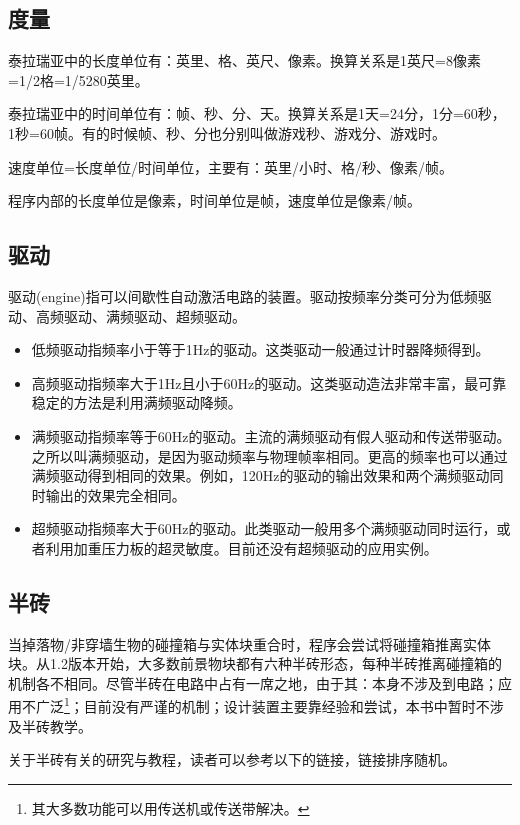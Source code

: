 \subsection{度量}
泰拉瑞亚中的长度单位有：英里、格、英尺、像素。换算关系是1英尺=8像素=1/2格=1/5280英里。

泰拉瑞亚中的时间单位有：帧、秒、分、天。换算关系是1天=24分，1分=60秒，1秒=60帧。有的时候帧、秒、分也分别叫做游戏秒、游戏分、游戏时。

速度单位=长度单位/时间单位，主要有：英里/小时、格/秒、像素/帧。

程序内部的长度单位是像素，时间单位是帧，速度单位是像素/帧。

\subsection{驱动}

驱动(engine)指可以间歇性自动激活电路的装置。驱动按频率分类可分为低频驱动、高频驱动、满频驱动、超频驱动。

\begin{itemize}
\item 低频驱动指频率小于等于1Hz的驱动。这类驱动一般通过计时器降频得到。
\item 高频驱动指频率大于1Hz且小于60Hz的驱动。这类驱动造法非常丰富，最可靠稳定的方法是利用满频驱动降频。
\item 满频驱动指频率等于60Hz的驱动。主流的满频驱动有假人驱动和传送带驱动。之所以叫满频驱动，是因为驱动频率与物理帧率相同。更高的频率也可以通过满频驱动得到相同的效果。例如，120Hz的驱动的输出效果和两个满频驱动同时输出的效果完全相同。
\item 超频驱动指频率大于60Hz的驱动。此类驱动一般用多个满频驱动同时运行，或者利用加重压力板的超灵敏度。目前还没有超频驱动的应用实例。
\end{itemize}

\subsection{半砖}

当掉落物/非穿墙生物的碰撞箱与实体块重合时，程序会尝试将碰撞箱推离实体块。从1.2版本开始，大多数前景物块都有六种半砖形态，每种半砖推离碰撞箱的机制各不相同。尽管半砖在电路中占有一席之地，由于其：本身不涉及到电路；应用不广泛\footnote{其大多数功能可以用传送机或传送带解决。}；目前没有严谨的机制；设计装置主要靠经验和尝试，本书中暂时不涉及半砖教学。

关于半砖有关的研究与教程，读者可以参考以下的链接，链接排序随机。


